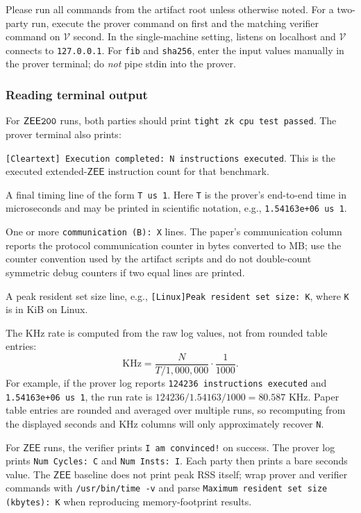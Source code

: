 \documentclass[nonacm,sigconf]{acmart}
\newcommand{\oursystem}{$\mathsf{ZEE}\tt{200}$\xspace}
\newcommand{\zee}[0]{\ensuremath{\mathsf{ZEE}}\xspace}
\let\P\undefined
\newcommand{\P}{\ensuremath{\mathcal{P}}\xspace}
\newcommand{\V}{\ensuremath{\mathcal{V}}\xspace}
\newcommand{\passmsg}{\texttt{tight zk cpu test passed}}
\begin{document}
Please run all commands from the artifact root unless otherwise noted.
For a two-party run, execute the prover command on \P first and the
matching verifier command on \V second. In the single-machine setting,
\P listens on localhost and \V connects to \texttt{127.0.0.1}. For
\texttt{fib} and \texttt{sha256}, enter the input values manually in
the prover terminal; do \emph{not} pipe stdin into the prover.

\subsubsection{Reading terminal output}

For \oursystem runs, both parties should print \passmsg. The prover
terminal also prints:
\begin{compactitem}
\item \texttt{[Cleartext] Execution completed: N instructions executed}.
This is the executed extended-\zee instruction count for that benchmark.
\item A final timing line of the form \texttt{T us 1}. Here
\texttt{T} is the prover's end-to-end time in microseconds and may be
printed in scientific notation, e.g., \texttt{1.54163e+06 us 1}.
\item One or more \texttt{communication (B): X} lines. The paper's
communication column reports the protocol communication counter in
bytes converted to MB; use the counter convention used by the artifact
scripts and do not double-count symmetric debug counters if two equal
lines are printed.
\item A peak resident set size line, e.g.,
\texttt{[Linux]Peak resident set size: K}, where \texttt{K} is in KiB
on Linux.
\end{compactitem}

The KHz rate is computed from the raw log values, not from rounded table
entries:
\[
\mathrm{KHz} =
  \frac{N}{T/1{,}000{,}000} \cdot \frac{1}{1000}.
\]
For example, if the prover log reports \texttt{124236 instructions
executed} and \texttt{1.54163e+06 us 1}, the run rate is
$124236 / 1.54163 / 1000 = 80.587$ KHz. Paper table entries are rounded
and averaged over multiple runs, so recomputing from the displayed
seconds and KHz columns will only approximately recover \texttt{N}.

For \zee runs, the verifier prints \texttt{I am convinced!} on success.
The prover log prints \texttt{Num Cycles: C} and \texttt{Num Insts: I}.
Each party then prints a bare seconds value. The \zee baseline does not
print peak RSS itself; wrap prover and verifier commands with
\texttt{/usr/bin/time -v} and parse \texttt{Maximum resident set size
(kbytes): K} when reproducing memory-footprint results.
\end{document}

